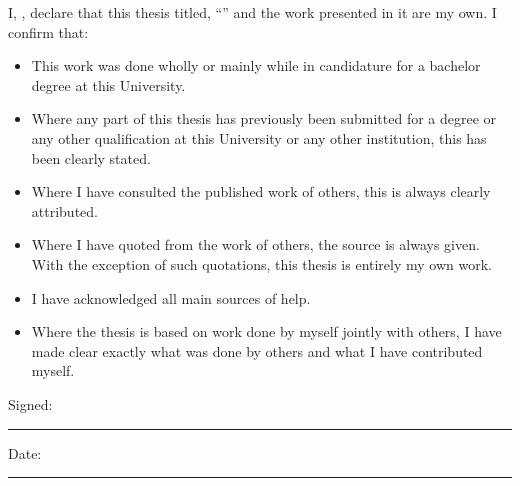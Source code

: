 \documentclass[
11pt, %
oneside, %
english, %
singlespacing, %
headsepline, %
]{MastersDoctoralThesis} %
\begin{document}
\begin{declaration}
\addchaptertocentry{\authorshipname}

\noindent I, \authorname, declare that this thesis titled, \enquote{\ttitle} and the work presented in it are my own. I confirm that:

\begin{itemize} 
\item This work was done wholly or mainly while in candidature for a bachelor degree at this University.
\item Where any part of this thesis has previously been submitted for a degree or any other qualification at this University or any other institution, this has been clearly stated.
\item Where I have consulted the published work of others, this is always clearly attributed.
\item Where I have quoted from the work of others, the source is always given. With the exception of such quotations, this thesis is entirely my own work.
\item I have acknowledged all main sources of help.
\item Where the thesis is based on work done by myself jointly with others, I have made clear exactly what was done by others and what I have contributed myself.\\
\end{itemize}
 
\noindent Signed:\\
\rule[0.5em]{25em}{0.5pt} %
 
\noindent Date:\\
\rule[0.5em]{25em}{0.5pt} %
\end{declaration}

\end{document}
